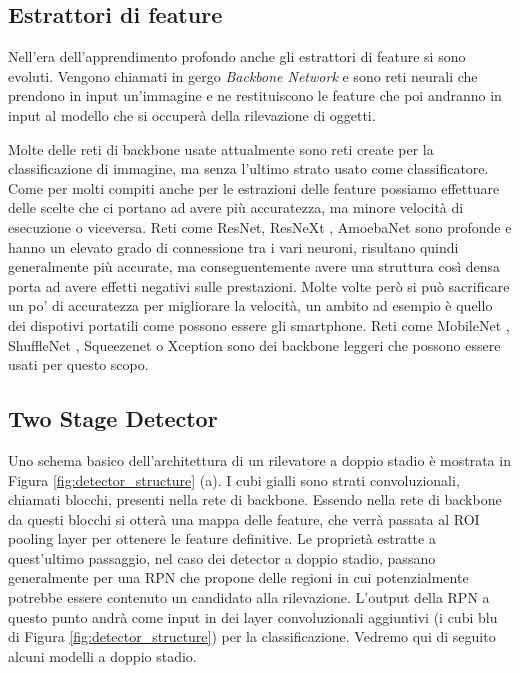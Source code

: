 \subsection{Estrattori di feature}
\label{sec:feature_extractor}
Nell'era dell'apprendimento profondo anche gli estrattori di feature si sono evoluti. Vengono chiamati in gergo \textit{Backbone Network} e sono reti neurali che prendono in input un'immagine e ne restituiscono le feature che poi andranno in input al modello che si occuperà della rilevazione di oggetti. 

Molte delle reti di backbone usate attualmente sono reti create per la classificazione di immagine, ma senza l'ultimo strato usato come classificatore. Come per molti compiti anche per le estrazioni delle feature possiamo effettuare delle scelte che ci portano ad avere più accuratezza, ma minore velocità di esecuzione o viceversa. 
Reti come ResNet\cite{viola2004robust}, ResNeXt \cite{he2015spatial}, AmoebaNet \cite{girshick2015fast} sono profonde e hanno un elevato grado di connessione tra i vari neuroni, risultano quindi generalmente più accurate, ma conseguentemente avere una struttura così densa porta ad avere effetti negativi sulle prestazioni. 
Molte volte però si può sacrificare un po' di accuratezza per migliorare la velocità, un ambito ad esempio è quello dei dispotivi portatili come possono essere gli smartphone. Reti come MobileNet \cite{ren2015faster}, ShuffleNet \cite{redmon2016you}, Squeezenet \cite{liu2016ssd} o Xception \cite{lin2017feature} sono dei backbone leggeri che possono essere usati per questo scopo. 

\subsection{Two Stage Detector}
\label{subsec:two_stage_detector}
Uno schema basico dell'architettura di un rilevatore a doppio stadio è mostrata in Figura \ref{fig:detector_structure} (a). I cubi gialli sono strati convoluzionali, chiamati blocchi, presenti nella rete di backbone. Essendo nella rete di backbone da questi blocchi si otterà una mappa delle feature, che verrà passata al \ac{ROI} pooling layer per ottenere le feature definitive. 
Le proprietà estratte a quest'ultimo passaggio, nel caso dei detector a doppio stadio, passano generalmente per una \ac{RPN} che propone delle regioni in cui potenzialmente potrebbe essere contenuto un candidato alla rilevazione. L'output della \ac{RPN} a questo punto andrà come input in dei layer convoluzionali aggiuntivi (i cubi blu di Figura \ref{fig:detector_structure}) per la classificazione.
Vedremo qui di seguito alcuni modelli a doppio stadio. 
